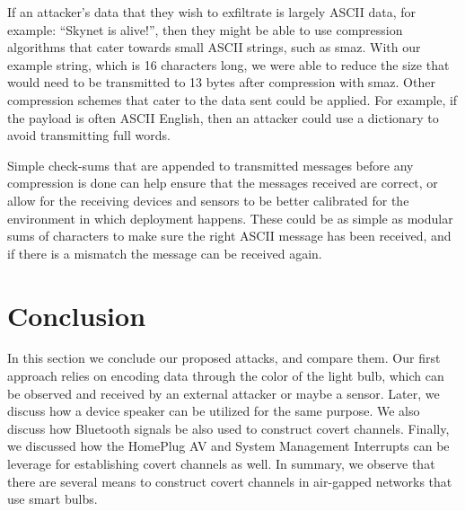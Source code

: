 \documentclass[conference]{IEEEtran}
\begin{document}
If an attacker's data that they wish to exfiltrate is largely ASCII data, for example: ``Skynet is alive!'', then they might be able to use compression algorithms that cater towards small ASCII strings, such as smaz\cite{smaz}. With our example string, which is 16 characters long, we were able to reduce the size that would need to be transmitted to 13 bytes after compression with smaz. Other compression schemes that cater to the data sent could be applied. For example, if the payload is often ASCII English, then an attacker could use a dictionary to avoid transmitting full words.

Simple check-sums that are appended to transmitted messages before any compression is done can help ensure that the messages received are correct, or allow for the receiving devices and sensors to be better calibrated for the environment in which deployment happens. These could be as simple as modular sums of characters to make sure the right ASCII message has been received, and if there is a mismatch the message can be received again.

\section{Conclusion}
\label{sec:Concl}

In this section we conclude our proposed attacks, and compare them. Our first approach relies on encoding data through the color of the light bulb, which can be observed and received by an external attacker or maybe a sensor. Later, we discuss how a device speaker can be utilized for the same purpose. We also discuss how Bluetooth signals be also used to construct covert channels. Finally, we discussed how the HomePlug AV and System Management Interrupts can be leverage for establishing covert channels as well. In summary, we observe that there are several means to construct covert channels in air-gapped networks that use smart bulbs.
\end{document}
